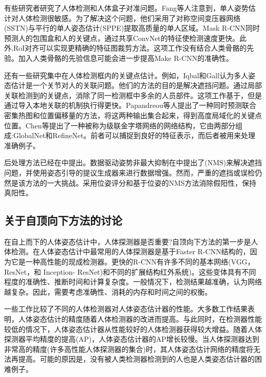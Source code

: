 \documentclass[hyperref]{ctexart}
\begin{document}
\begin{multicols}{2}
		有些研究者研究了人体检测和人体盒子对准问题。Fang等人\cite{fang2017rmpe}注意到，单人姿势估计对人体检测很敏感。为了解决这个问题，他们采用了对称空间变压器网络(SSTN)与平行的单人姿态估计(SPPE)提取高质量的单人区域。Mask R-CNN\cite{he2017mask}同时预测人的包围盒和人的关键点，通过共享ConvNet的特征使检测速度更快。此外,RoI对齐可以实现更精确的特征图裁剪方法。这项工作没有结合人类骨骼的先验。加入人类骨骼的先验信息可能会进一步提高Make R-CNN的准确性。
		
		还有一些研究集中在人体检测框内的关键点估计。例如，Iqbal和Gall\cite{iqbal2016multi}认为多人姿态估计是一个关节对人的关联问题。他们的方法的目的是解决遮挡问题。通过局部关联检测到的关键点，消除了同一检测框中多余的人员部件。这项工作基于\cite{martinez2017simple}，但是通过导入本地关联的机制执行得更快。Papandreou等人\cite{DBLP:journals/corr/PapandreouZKTTB17}提出了一种同时预测联合密集热图和位置偏移量的方法，将这两种输出集合起来，得到高度局域化的关键点位置。Chen等\cite{chen2018cascaded}提出了一种被称为级联金字塔网络的网络结构，它由两部分组成:GlobalNet和RefineNet。前者可以捕捉到良好的特征表示，而后者被用来处理准确例子。
		
		后处理方法已经在\cite{fang2017rmpe}中提出。数据驱动姿势非最大抑制在\cite{fang2017rmpe}中提出了(NMS)来解决遮挡问题，并使用姿态引导的提议生成器来进行数据增强。然而，严重的遮挡或误检仍然是该方法的一大挑战。\cite{DBLP:journals/corr/PapandreouZKTTB17}采用位姿评分和基于位姿的NMS方法消除假阳性，保持真阳性。
		\subsection{关于自顶向下方法的讨论}
		在自上而下的人体姿态估计中，人体探测器是否重要?自顶向下方法的第一步是人体检测。在人体姿态估计中最常用的人体探测器是基于Faster R-CNN结构的，因为它是一种高性能的现成检测器。更快的R-CNN有许多不同的基本网络(VGG\cite{simonyan2014very}， ResNet\cite{he2016deep}，和
		Inception- ResNet\cite{szegedy2017inception})和不同的扩展结构红外系统\cite{8099589})。这些变体具有不同程度的准确性、推断时间和计算复杂度。一般情况下，检测结果越准确，认为网络越复杂。因此，需要考虑准确性、消耗的内存和时间之间的权衡。
		
		一些工作比较了不同的人体检测器对人体姿态估计器的性能\cite{chen2018cascaded}。大多数工作结果表明，人体姿态估计的精度随着人体检测器的改进而提高。与此同时，在检测器性能较低的情况下，人体姿态估计器从性能较好的人体检测器获得较大增益。随着人体探测器平均精度的提高(AP)，人体姿态估计器的AP增长较慢。当人体探测器达到非常高的精度(许多高性能人体探测器的集合)时，其人体姿态估计网络的精度将无法再提高。可能的原因是，没有被人类检测器检测到的人也是人类姿态估计器的困难例子。
		

\end{multicols}
\end{document}
